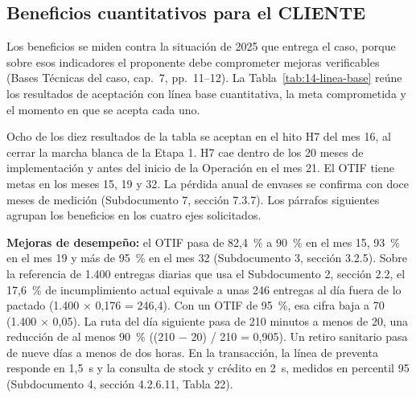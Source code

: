 \subsection{Beneficios cuantitativos para el CLIENTE}

Los beneficios se miden contra la situación de 2025 que entrega el caso, porque sobre esos indicadores el proponente debe comprometer mejoras verificables (Bases Técnicas del caso, cap.~7, pp.~11--12). La Tabla~\ref{tab:14-linea-base} reúne los resultados de aceptación con línea base cuantitativa, la meta comprometida y el momento en que se acepta cada uno.


Ocho de los diez resultados de la tabla se aceptan en el hito H7 del mes 16, al cerrar la marcha blanca de la Etapa 1. H7 cae dentro de los 20 meses de implementación y antes del inicio de la Operación en el mes 21. El OTIF tiene metas en los meses 15, 19 y 32. La pérdida anual de envases se confirma con doce meses de medición (Subdocumento 7, sección 7.3.7). Los párrafos siguientes agrupan los beneficios en los cuatro ejes solicitados.

\textbf{Mejoras de desempeño:} el OTIF pasa de 82,4~\% a 90~\% en el mes 15, 93~\% en el mes 19 y más de 95~\% en el mes 32 (Subdocumento 3, sección 3.2.5). Sobre la referencia de 1.400 entregas diarias que usa el Subdocumento 2, sección 2.2, el 17,6~\% de incumplimiento actual equivale a unas 246 entregas al día fuera de lo pactado (1.400 $\times$ 0,176 = 246,4). Con un OTIF de 95~\%, esa cifra baja a 70 (1.400 $\times$ 0,05). La ruta del día siguiente pasa de 210 minutos a menos de 20, una reducción de al menos 90~\% ((210 $-$ 20) / 210 = 0,905). Un retiro sanitario pasa de nueve días a menos de dos horas. En la transacción, la línea de preventa responde en 1,5~s y la consulta de stock y crédito en 2~s, medidos en percentil 95 (Subdocumento 4, sección 4.2.6.11, Tabla 22).

